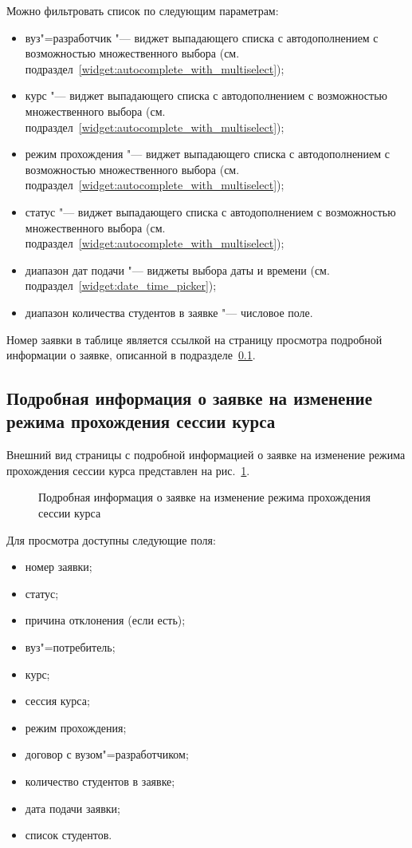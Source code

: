 Можно фильтровать список по следующим параметрам:
\begin{itemize}
	\item вуз"=разработчик "--- виджет выпадающего списка с автодополнением с возможностью множественного выбора 
	(см. подраздел~\ref{widget:autocomplete_with_multiselect});
	\item курс "--- виджет выпадающего списка с автодополнением с возможностью множественного выбора 
	(см. подраздел~\ref{widget:autocomplete_with_multiselect});
	\item режим прохождения "--- виджет выпадающего списка с автодополнением с возможностью множественного выбора 
	(см. подраздел~\ref{widget:autocomplete_with_multiselect});
	\item статус "--- виджет выпадающего списка с автодополнением с возможностью множественного выбора 
	(см. подраздел~\ref{widget:autocomplete_with_multiselect});
	\item диапазон дат подачи "--- виджеты выбора даты и времени 
	(см. подраздел~\ref{widget:date_time_picker});
	\item диапазон количества студентов в заявке "--- числовое поле.
\end{itemize}

Номер заявки в таблице является ссылкой на страницу просмотра подробной информации о заявке, 
описанной в подразделе~\ref{sec:change_mode_req_detail}.

\subsection{Подробная информация о заявке на изменение режима прохождения сессии курса} 
\label{sec:change_mode_req_detail}

Внешний вид страницы с подробной информацией о заявке на изменение режима прохождения сессии курса представлен 
на рис.~\ref{img:student:change_mode_req_detail}.
\begin{figure}[H]
	\caption{Подробная информация о заявке на изменение режима прохождения сессии курса}
	\label{img:student:change_mode_req_detail}
\end{figure}

Для просмотра доступны следующие поля:
\begin{itemize}
	\item номер заявки;
	\item статус;
	\item причина отклонения (если есть);
	\item вуз"=потребитель;
	\item курс;
	\item сессия курса;
	\item режим прохождения;
	\item договор с вузом"=разработчиком;
	\item количество студентов в заявке;
	\item дата подачи заявки;
	\item список студентов.
\end{itemize}

